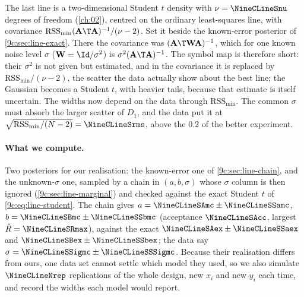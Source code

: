 The last line is a two-dimensional Student $t$ density with $\nu=\NineCLineSnu$ degrees of freedom
(\cref{ch:02}), centred on the ordinary least-squares line, with covariance
$\mathrm{RSS}_{\min}(\mathbf A\T\mathbf A)^{-1}/(\nu-2)$. Set it beside the known-error posterior of
\cref{9c:sec:line-exact}. There the covariance was $(\mathbf A\T\mathbf W\mathbf A)^{-1}$, which for one
known noise level $\sigma$ ($\mathbf W=\Id/\sigma^2$) is $\sigma^2(\mathbf A\T\mathbf A)^{-1}$. The symbol map is
therefore short: their $\sigma^2$ is not given but estimated, and in the covariance it is replaced by
$\mathrm{RSS}_{\min}/(\nu-2)$, the scatter the data actually show about the best line; the Gaussian becomes a
Student $t$, with heavier tails, because that estimate is itself uncertain. The widths now depend on the data
through $\mathrm{RSS}_{\min}$. The common $\sigma$ must absorb the larger scatter of $D_1$, and the data put it at
$\sqrt{\mathrm{RSS}_{\min}/(N-2)}=\NineCLineSrms$, above the $0.2$ of the better experiment.

\paragraph{What we compute.} Two posteriors for our realisation: the known-error one of
\cref{9c:sec:line-chain}, and the unknown-$\sigma$ one, sampled by a chain in $(a,b,\sigma)$ whose $\sigma$ column
is then ignored (\cref{9c:sec:line-marginal}) and checked against the exact Student $t$ of
\eqref{9c:eq:line-student}. The chain gives $a=\NineCLineSAmc\pm\NineCLineSSamc$,
$b=\NineCLineSBmc\pm\NineCLineSSbmc$ (acceptance $\NineCLineSAcc$, largest $\hat R=\NineCLineSRmax$), against
the exact $\NineCLineSAex\pm\NineCLineSSaex$ and $\NineCLineSBex\pm\NineCLineSSbex$; the data say
$\sigma=\NineCLineSSigmc\pm\NineCLineSSSigmc$. Because their realisation differs from ours, one data set
cannot settle which model they used, so we also simulate $\NineCLineNrep$ replications of the whole design,
new $x_i$ and new $y_i$ each time, and record the widths each model would report.

